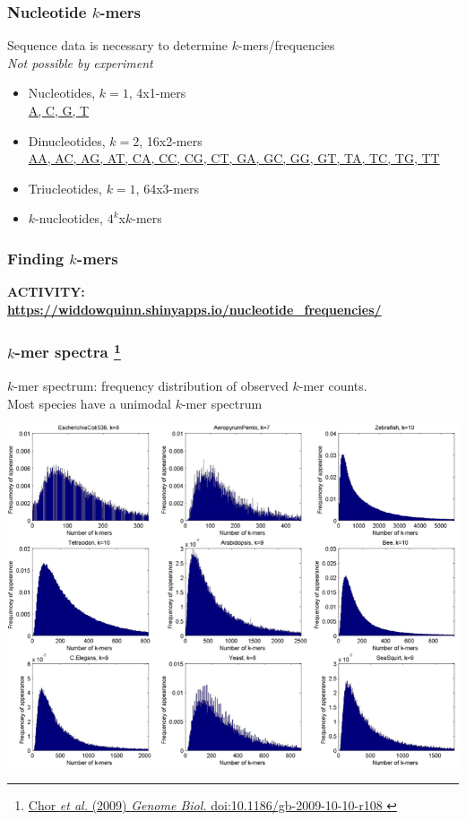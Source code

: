 %
\begin{frame}
  \frametitle{Nucleotide $k$-mers}
  Sequence data is necessary to determine $k$-mers/frequencies \\
  \textit{Not possible by experiment}
  \begin{itemize}
    \item \textcolor{hutton_green}{Nucleotides, $k=1$, 4x1-mers} \\
      \url{A, C, G, T}
    \item \textcolor{hutton_blue}{Dinucleotides, $k=2$, 16x2-mers} \\
      \url{AA, AC, AG, AT, CA, CC, CG, CT, GA, GC, GG, GT, TA, TC, TG, TT}
    \item \textcolor{RawSienna}{Triucleotides, $k=1$, 64x3-mers}
    \item \textcolor{hutton_purple}{$k$-nucleotides, $4^k$x$k$-mers}
  \end{itemize}  
\end{frame}

%
\begin{frame}
  \frametitle{Finding $k$-mers}
  \Large{
    \textcolor{hutton_blue}{
      \textbf{
      ACTIVITY: \\
      \small{
        \href{https://widdowquinn.shinyapps.io/nucleotide_frequencies/}{https://widdowquinn.shinyapps.io/nucleotide\_frequencies/}
        }
      }
    }
  }
\end{frame}

%
\begin{frame}
  \frametitle{$k$-mer spectra
  \footnote{\tiny{\href{http://dx.doi.org/10.1186/gb-2009-10-10-r108
}{Chor \textit{et al.} (2009) \textit{Genome Biol.} doi:10.1186/gb-2009-10-10-r108
}}}
  }
  \textcolor{RawSienna}{$k$-mer spectrum: frequency distribution of observed $k$-mer counts.} \\
  Most species have a unimodal $k$-mer spectrum
  \begin{center}
    \includegraphics[height=0.6\textheight]{images/kmer_spectra} \\
  \end{center}  
\end{frame}

